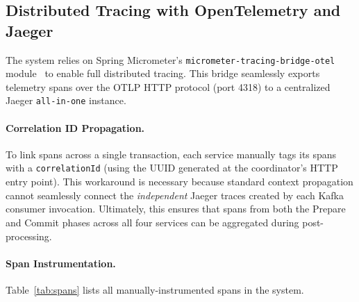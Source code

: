 \documentclass[]{USG}
\begin{document}
\subsection{Distributed Tracing with OpenTelemetry and Jaeger}
\label{subsec:tracing-design}

The system relies on Spring Micrometer's \texttt{micrometer-tracing-bridge-otel}
module~\cite{micrometer2024} to enable full distributed tracing.
%
This bridge seamlessly exports telemetry spans over the OTLP HTTP protocol
(port 4318) to a centralized Jaeger \texttt{all-in-one} instance.

\paragraph{Correlation ID Propagation.}
To link spans across a single transaction, each service manually tags its
spans with a \texttt{correlationId} (using the UUID generated at the
coordinator's HTTP entry point).
%
This workaround is necessary because standard context propagation cannot seamlessly
connect the \emph{independent} Jaeger traces created by each Kafka consumer invocation.
%
Ultimately, this ensures that spans from both the Prepare and Commit phases
across all four services can be aggregated during post-processing.

\paragraph{Span Instrumentation.}
Table~\ref{tab:spans} lists all manually-instrumented spans in the system.
\end{document}
